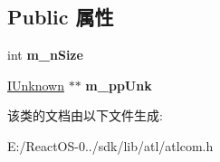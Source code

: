 \subsection*{Public 属性}
\begin{DoxyCompactItemize}
\item 
\mbox{\label{class_a_t_l_1_1_c_com_dynamic_unk_array_a34abf52121431c9039a1cc03fd74544f}} 
int {\bfseries m\+\_\+n\+Size}
\item 
\mbox{\label{class_a_t_l_1_1_c_com_dynamic_unk_array_aa5e4f64587e3814c8a431a844b869522}} 
\hyperlink{interface_i_unknown}{I\+Unknown} $\ast$$\ast$ {\bfseries m\+\_\+pp\+Unk}
\end{DoxyCompactItemize}


该类的文档由以下文件生成\+:\begin{DoxyCompactItemize}
\item 
E\+:/\+React\+O\+S-\/0../sdk/lib/atl/atlcom.\+h\end{DoxyCompactItemize}
